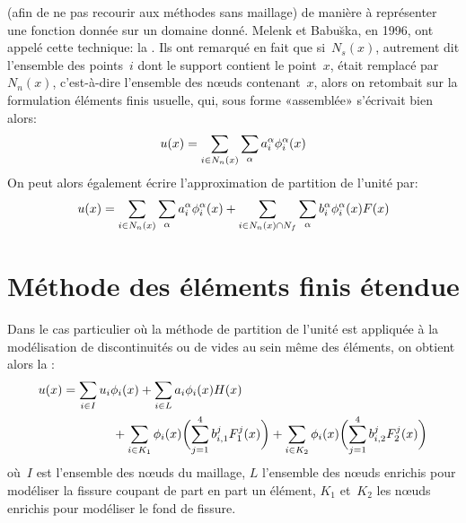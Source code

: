  (afin de ne pas recourir aux méthodes sans maillage) de manière à représenter une fonction donnée sur un domaine donné. Melenk et Babu\u{s}ka, en 1996, ont appelé cette technique: la .
Ils ont remarqué en fait que si~$N_s(x)$, autrement dit l'ensemble des points~$i$ dont le support contient le point~$x$, était remplacé par~$N_n(x)$, c'est-à-dire l'ensemble des nœuds contenant~$x$, alors on retombait sur la formulation éléments finis usuelle, qui, sous forme «assemblée» s'écrivait bien alors:
\begin{equation}
u(x) = \displaystyle\sum_{i\in N_n(x)}\displaystyle\sum_{\alpha} a_i^\alpha \phi_i^\alpha(x)
\end{equation}
 On peut alors également écrire l'approximation de partition de l'unité par:
\begin{equation}
u(x) = \displaystyle\sum_{i\in N_n(x)}\displaystyle\sum_{\alpha} a_i^\alpha \phi_i^\alpha(x) + \displaystyle\sum_{i\in N_n(x)\cap N_f}\displaystyle\sum_{\alpha} b_i^\alpha\phi_i^\alpha(x)F(x)
\end{equation}


\medskip
\section{Méthode des éléments finis étendue}\label{Sec-XFEM}

Dans le cas particulier où la méthode de partition de l'unité est appliquée à la modélisation de discontinuités ou de vides au sein même des éléments, on obtient alors la :
\begin{equation}
\begin{aligned}
u(x) &= \displaystyle\sum_{i\in I}u_i\phi_i(x) + \displaystyle\sum_{i\in L} a_i\phi_i(x) H(x)\\
&\qquad\qquad + \displaystyle\sum_{i\in K_1}\phi_i(x)\biggl(\displaystyle\sum_{j=1}^4b_{i,1}^jF_1^j(x)\biggr) + \displaystyle\sum_{i\in K_2}\phi_i(x)\biggl(\displaystyle\sum_{j=1}^4b_{i,2}^jF_2^j(x)\biggr)
\end{aligned}
\end{equation}
où~$I$ est l'ensemble des nœuds du maillage, $L$ l'ensemble des nœuds enrichis pour modéliser la fissure coupant de part en part un élément, $K_1$ et~$K_2$ les nœuds enrichis pour modéliser le fond de fissure.

